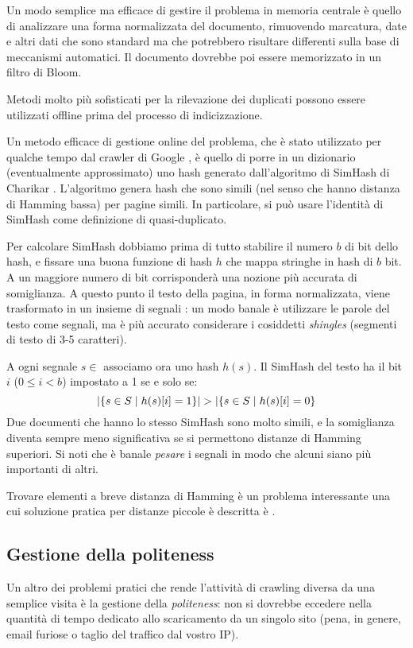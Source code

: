 Un modo semplice ma efficace di gestire il problema in memoria centrale è quello di analizzare una forma normalizzata del documento, rimuovendo marcatura, date e altri dati che sono standard ma che potrebbero risultare differenti sulla base di meccanismi automatici. Il documento dovrebbe poi essere memorizzato in un filtro di Bloom.

Metodi molto più sofisticati per la rilevazione dei duplicati possono essere utilizzati offline prima del processo di indicizzazione.

Un metodo efficace di gestione online del problema, che è stato utilizzato per qualche tempo dal crawler di Google \cite{simhashgoogle}, è quello di porre in un dizionario (eventualmente approssimato) uno hash generato dall'algoritmo di SimHash di Charikar \cite{SimHash}. L'algoritmo genera hash che sono simili (nel senso che hanno distanza di Hamming bassa) per pagine simili. In particolare, si può usare l'identità di SimHash come definizione di quasi-duplicato.

Per calcolare SimHash dobbiamo prima di tutto stabilire il numero $b$ di bit dello hash, e fissare una buona funzione di hash $h$ che mappa stringhe in hash di $b$ bit. A un maggiore numero di bit corrisponderà una nozione più accurata di somiglianza. A questo punto il testo della pagina, in forma normalizzata, viene trasformato in un insieme di segnali : un modo banale è utilizzare le parole del testo come segnali, ma è più accurato considerare i cosiddetti \textit{shingles} (segmenti di testo di 3-5 caratteri).

A ogni segnale $s \in$  associamo ora uno hash $h(s)$. Il SimHash del testo ha il bit $i$ ($0 \leq i < b$) impostato a 1 se e solo se:
\begin{equation*}
    |\{s \in S \hspace{1mm}|\hspace{1mm} h(s)[i] = 1\}| > |\{s \in S \hspace{1mm}|\hspace{1mm} h(s)[i] = 0\}
\end{equation*}
Due documenti che hanno lo stesso SimHash sono molto simili, e la somiglianza diventa sempre meno significativa se si permettono distanze di Hamming superiori. Si noti che è banale \textit{pesare} i segnali in modo che alcuni siano più importanti di altri.

Trovare elementi a breve distanza di Hamming è un problema interessante una cui soluzione pratica per distanze piccole è descritta è \cite{google}.

\subsection{Gestione della politeness}
Un altro dei problemi pratici che rende l'attività di crawling diversa da una semplice visita è la gestione della \textit{politeness}: non si dovrebbe eccedere nella quantità di tempo dedicato allo scaricamento da un singolo sito (pena, in genere, email furiose o taglio del traffico dal vostro IP).

